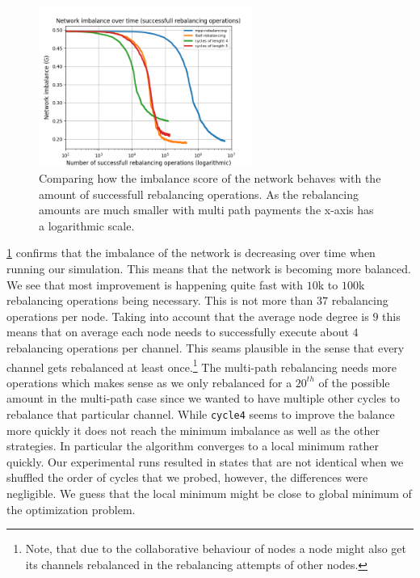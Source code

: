 \documentclass[conference]{IEEEtran}
\begin{document}
\begin{figure}
 \centering
 \includegraphics[width=7cm]{code/vs/fig/imba_vs_steps.png}
 \caption{Comparing how the imbalance score of the network behaves with the amount of successfull rebalancing operations. As the rebalancing amounts are much smaller with multi path payments the x-axis has a logarithmic scale.}
 \label{fig:imbalancehovertime}
\end{figure}

\cref{fig:imbalancehovertime} confirms that the imbalance of the network is decreasing over time when running our simulation.
This means that the network is becoming more balanced.
We see that most improvement is happening quite fast with $10$k to $100$k rebalancing operations being necessary.
This is not more than $37$ rebalancing operations per node.
Taking into account that the average node degree is $9$ this means that on average each node needs to successfully execute about $4$ rebalancing operations per channel.  
This seams plausible in the sense that every channel gets rebalanced at least once.\footnote{Note, that due to the collaborative behaviour of nodes a node might also get its channels rebalanced in the rebalancing attempts of other nodes.}
The multi-path rebalancing needs more operations which makes sense as we only rebalanced for a $20^{th}$ of the possible amount in the multi-path case since we wanted to have multiple other cycles to rebalance that particular channel.
While \texttt{cycle4} seems to improve the balance more quickly it does not reach the minimum imbalance as well as the other strategies.
In particular the algorithm converges to a local minimum rather quickly.
Our experimental runs resulted in states that are not identical when we shuffled the order of cycles that we probed, however, the differences were negligible. 
We guess that the local minimum might be close to global minimum of the optimization problem.
\end{document}
